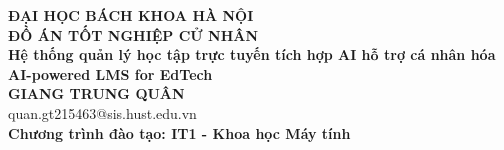 \documentclass[DoAn.tex]{subfiles}
\begin{document}
\begin{titlepage}
\thispagestyle{empty}
\begin{center}

{\textbf{\large{ĐẠI HỌC BÁCH KHOA HÀ NỘI}}}\\[2.6cm]

{\textbf{\huge{ĐỒ ÁN TỐT NGHIỆP CỬ NHÂN}}}\\[1cm]
{\textbf{\Large{Hệ thống quản lý học tập trực tuyến tích hợp AI hỗ trợ cá nhân hóa}}}\\[0.4cm]
{\textbf{\large{AI-powered LMS for EdTech}}}\\[1.2cm]

{\textbf{\large{GIANG TRUNG QUÂN}}}\\[0.5cm]
{\large{quan.gt215463@sis.hust.edu.vn}}\\[0.5cm]

{\textbf{\large{Chương trình đào tạo: IT1 - Khoa học Máy tính}}}\\[0.5cm]

\vspace{2.2cm}
\begin{table}[H]
\centering
{}
\end{table}
\end{center}



\end{titlepage}
\end{document}
